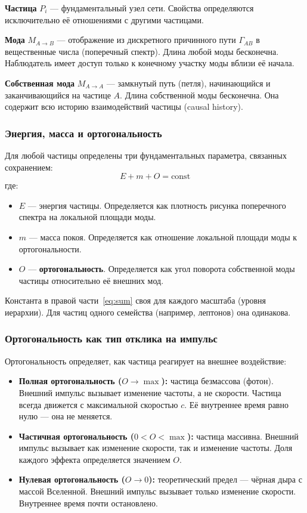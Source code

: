 \documentclass[12pt,a4paper]{article}
\begin{document}
\textbf{Частица} $P_i$ --- фундаментальный узел сети. Свойства определяются исключительно её отношениями с другими частицами.

\textbf{Мода} $M_{A \to B}$ --- отображение из дискретного причинного пути $\Gamma_{AB}$ в вещественные числа (поперечный спектр). Длина любой моды бесконечна. Наблюдатель имеет доступ только к конечному участку моды вблизи её начала.

\textbf{Собственная мода} $M_{A \to A}$ --- замкнутый путь (петля), начинающийся и заканчивающийся на частице $A$. Длина собственной моды бесконечна. Она содержит всю историю взаимодействий частицы (causal history).

\subsubsection{Энергия, масса и ортогональность}

Для любой частицы определены три фундаментальных параметра, связанных сохранением:
\begin{equation}
    E + m + O = \text{const}
    \label{eq:sum}
\end{equation}
где:
\begin{itemize}
    \item $E$ --- энергия частицы. Определяется как плотность рисунка поперечного спектра на локальной площади моды.
    \item $m$ --- масса покоя. Определяется как отношение локальной площади моды к ортогональности.
    \item $O$ --- \textbf{ортогональность}. Определяется как угол поворота собственной моды частицы относительно её внешних мод.
\end{itemize}

Константа в правой части~\eqref{eq:sum} своя для каждого масштаба (уровня иерархии). Для частиц одного семейства (например, лептонов) она одинакова.

\subsubsection{Ортогональность как тип отклика на импульс}
Ортогональность определяет, как частица реагирует на внешнее воздействие:
\begin{itemize}
    \item \textbf{Полная ортогональность ($O \to \max$):} частица безмассова (фотон). Внешний импульс вызывает изменение частоты, а не скорости. Частица всегда движется с максимальной скоростью $c$. Её внутреннее время равно нулю --- она не меняется.
    \item \textbf{Частичная ортогональность ($0 < O < \max$):} частица массивна. Внешний импульс вызывает как изменение скорости, так и изменение частоты. Доля каждого эффекта определяется значением $O$.
    \item \textbf{Нулевая ортогональность ($O \to 0$):} теоретический предел --- чёрная дыра с массой Вселенной. Внешний импульс вызывает только изменение скорости. Внутреннее время почти остановлено.
\end{itemize}
\end{document}
